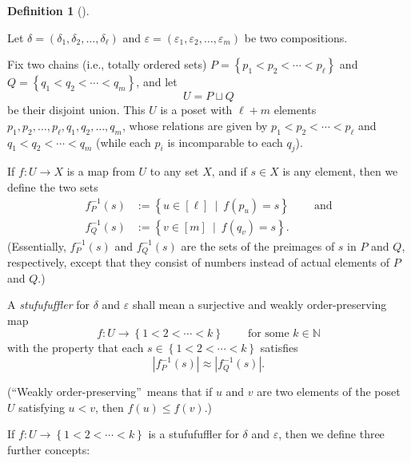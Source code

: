 \documentclass[numbers=enddot,12pt,final,onecolumn,notitlepage]{scrartcl}%
\theoremstyle{definition}
\newtheorem{defi}[theo]{Definition}
\newenvironment{definition}[1][]
{\begin{defi}[#1]\begin{leftbar}}
{\end{leftbar}\end{defi}}
\begin{document}
\begin{definition}
\label{def.stufufuffler}Let $\delta=\left(  \delta_{1},\delta_{2}%
,\ldots,\delta_{\ell}\right)  $ and $\varepsilon=\left(  \varepsilon
_{1},\varepsilon_{2},\ldots,\varepsilon_{m}\right)  $ be two compositions.

Fix two chains (i.e., totally ordered sets) $P=\left\{  p_{1}<p_{2}%
<\cdots<p_{\ell}\right\}  $ and $Q=\left\{  q_{1}<q_{2}<\cdots<q_{m}\right\}
$, and let%
\[
U=P\sqcup Q
\]
be their disjoint union. This $U$ is a poset with $\ell+m$ elements
$p_{1},p_{2},\ldots,p_{\ell},q_{1},q_{2},\ldots,q_{m}$, whose relations are
given by $p_{1}<p_{2}<\cdots<p_{\ell}$ and $q_{1}<q_{2}<\cdots<q_{m}$ (while
each $p_{i}$ is incomparable to each $q_{j}$).

If $f:U\rightarrow X$ is a map from $U$ to any set $X$, and if $s\in X$ is any
element, then we define the two sets%
\begin{align*}
f_{P}^{-1}\left(  s\right)   &  :=\left\{  u\in\left[  \ell\right]
\ \mid\ f\left(  p_{u}\right)  =s\right\}  \ \ \ \ \ \ \ \ \ \ \text{and}\\
f_{Q}^{-1}\left(  s\right)   &  :=\left\{  v\in\left[  m\right]
\ \mid\ f\left(  q_{v}\right)  =s\right\}  .
\end{align*}
(Essentially, $f_{P}^{-1}\left(  s\right)  $ and $f_{Q}^{-1}\left(  s\right)
$ are the sets of the preimages of $s$ in $P$ and $Q$, respectively, except
that they consist of numbers instead of actual elements of $P$ and $Q$.)

A \emph{stufufuffler} for $\delta$ and $\varepsilon$ shall mean a surjective
and weakly order-preserving map%
\[
f:U\rightarrow\left\{  1<2<\cdots<k\right\}  \ \ \ \ \ \ \ \ \ \ \text{for
some }k\in\mathbb{N}%
\]
with the property that each $s\in\left\{  1<2<\cdots<k\right\}  $ satisfies%
\begin{equation}
\left\vert f_{P}^{-1}\left(  s\right)  \right\vert \approx\left\vert
f_{Q}^{-1}\left(  s\right)  \right\vert .
\label{eq.def.limstuffler.liminality}%
\end{equation}


(\textquotedblleft Weakly order-preserving\textquotedblright\ means that if
$u$ and $v$ are two elements of the poset $U$ satisfying $u<v$, then $f\left(
u\right)  \leq f\left(  v\right)  $.)

If $f:U\rightarrow\left\{  1<2<\cdots<k\right\}  $ is a stufufuffler for
$\delta$ and $\varepsilon$, then we define three further concepts:


\end{definition}
\end{document}
